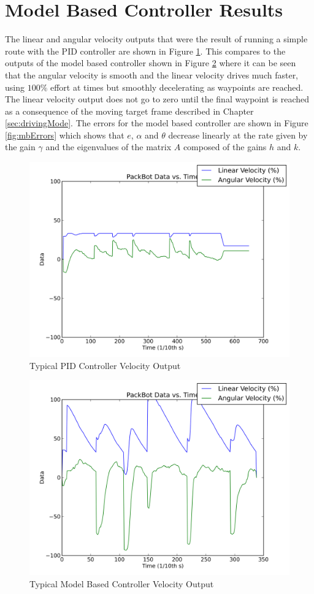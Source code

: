 \section{Model Based Controller Results}
\label{sec:lyapunovResults}
The linear and angular velocity outputs that were the result of running a simple route with the PID controller are shown in Figure \ref{fig:pidOutput}. This compares to the outputs of the model based controller shown in Figure \ref{fig:mbOutput} where it can be seen that the angular velocity is smooth and the linear velocity drives much faster, using $100\%$ effort at times but smoothly decelerating as waypoints are reached. The linear velocity output does not go to zero until the final waypoint is reached as a consequence of the moving target frame described in Chapter \ref{sec:drivingMode}. The errors for the model based controller are shown in Figure \ref{fig:mbErrors} which shows that $e$, $\alpha$ and $\theta$ decrease linearly at the rate given by the gain $\gamma$ and the eigenvalues of the matrix $A$ composed of the gains $h$ and $k$.

\begin{figure}[ht!]
	\centering
	\includegraphics[width=.5\textwidth]{images/pbtx/20110109_1815_pbtx_simpleDrivePID}
	\caption{Typical PID Controller Velocity Output}
	\label{fig:pidOutput}
\end{figure}

\begin{figure}[ht!]
	\centering
	\includegraphics[width=.5\textwidth]{images/pbtx/20110113_1451_pbtx_simpleDrive}
	\caption{Typical Model Based Controller Velocity Output}
	\label{fig:mbOutput}
\end{figure}


